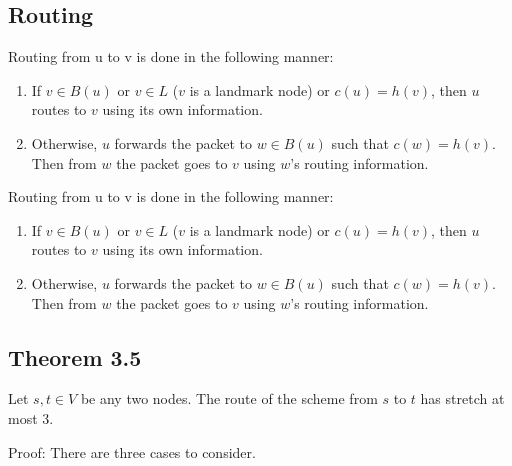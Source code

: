 \subsection{Routing}
Routing from u to v is done in the following manner:
\begin{enumerate}
    \item If $v \in B(u)$ or $v \in L$ ($v$ is a landmark node) or $c(u) =
        h(v)$, then $u$ routes to $v$ using its own information.
    \item Otherwise, $u$ forwards the packet to $w \in B(u)$ such that
        $c(w) = h(v)$. Then from $w$ the packet goes to $v$ using $w$’s
        routing information.
\end{enumerate}
Routing from u to v is done in the following manner:
\begin{enumerate}
    \item If $v \in B(u)$ or $v \in L$ ($v$ is a landmark node) or $c(u) =
        h(v)$, then $u$ routes to $v$ using its own information.
    \item Otherwise, $u$ forwards the packet to $w \in B(u)$ such that
        $c(w) = h(v)$. Then from $w$ the packet goes to $v$ using $w$’s
        routing information.
\end{enumerate}


\subsection{Theorem 3.5}
Let $s,t\in V$ be any two nodes. The route of the scheme from $s$ to $t$ has stretch at most 3.

Proof: 
There are three cases to consider.
